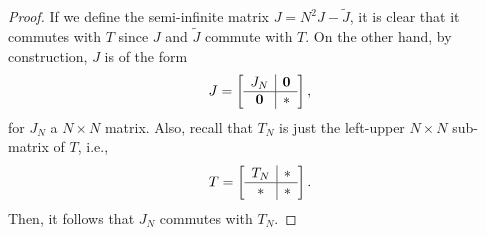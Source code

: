 \documentclass[10pt,a4paper]{amsart}
\def \wt {\widetilde}
\begin{document}
\begin{proof}
If we define the semi-infinite matrix $J=N^2J - \wt J$, it is clear that it commutes with $T$ since $J$ and $\wt J$ commute with $T$. On the other hand, by construction, $J$ is of the form
$$J=
\left[\begin{array}{c|c}
J_N&\bf 0\\\hline
\bf 0 & *
\end{array}\right],
$$
for $J_N$ a $N\times N$ matrix. 
Also, recall that $T_N$ is just the left-upper $N\times N$ sub-matrix of $T$, i.e., 
$$T=
\left[\begin{array}{c|c}
T_N&\bf *\\\hline
\bf * & \bf*
\end{array}\right].
$$
Then, it follows that $J_N$ commutes with $T_N$.
\end{proof}
\end{document}
